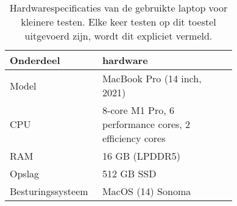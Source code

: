 \begin{table}[ht]
    \centering
    \begin{tabular}{p{0.20\linewidth}p{0.54\linewidth}}
        Onderdeel         & hardware                                               \\
        \hline\hline
        Model             & MacBook Pro (14 inch, 2021)                            \\
        CPU               & 8-core M1 Pro, 6 performance cores, 2 efficiency cores \\
        RAM               & 16 GB (LPDDR5)                                         \\
        Opslag            & 512 GB SSD                                             \\
        Besturingssysteem & MacOS (14) Sonoma                                      \\
        \hline
    \end{tabular}
    \caption{Hardwarespecificaties van de gebruikte laptop voor kleinere testen. Elke keer testen op dit toestel uitgevoerd zijn, wordt dit expliciet vermeld.}
    \label{tab:macbook_hardware}
\end{table}

